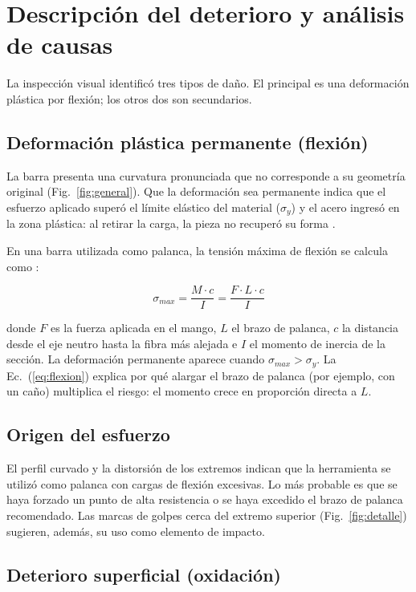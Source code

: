 \documentclass[runningheads]{llncs}
\begin{document}
\section{Descripción del deterioro y análisis de causas}

La inspección visual identificó tres tipos de daño. El principal es una deformación plástica por flexión; los otros dos son secundarios.

\subsection{Deformación plástica permanente (flexión)}

La barra presenta una curvatura pronunciada que no corresponde a su geometría original (Fig.~\ref{fig:general}). Que la deformación sea permanente indica que el esfuerzo aplicado superó el límite elástico del material ($\sigma_y$) y el acero ingresó en la zona plástica: al retirar la carga, la pieza no recuperó su forma \cite{callister}.

En una barra utilizada como palanca, la tensión máxima de flexión se calcula como \cite{beer}:

\begin{equation}
\sigma_{max} = \frac{M \cdot c}{I} = \frac{F \cdot L \cdot c}{I}
\label{eq:flexion}
\end{equation}

donde $F$ es la fuerza aplicada en el mango, $L$ el brazo de palanca, $c$ la distancia desde el eje neutro hasta la fibra más alejada e $I$ el momento de inercia de la sección. La deformación permanente aparece cuando $\sigma_{max} > \sigma_y$. La Ec.~(\ref{eq:flexion}) explica por qué alargar el brazo de palanca (por ejemplo, con un caño) multiplica el riesgo: el momento crece en proporción directa a $L$.

\subsection{Origen del esfuerzo}

El perfil curvado y la distorsión de los extremos indican que la herramienta se utilizó como palanca con cargas de flexión excesivas. Lo más probable es que se haya forzado un punto de alta resistencia o se haya excedido el brazo de palanca recomendado. Las marcas de golpes cerca del extremo superior (Fig.~\ref{fig:detalle}) sugieren, además, su uso como elemento de impacto.

\subsection{Deterioro superficial (oxidación)}
\end{document}
